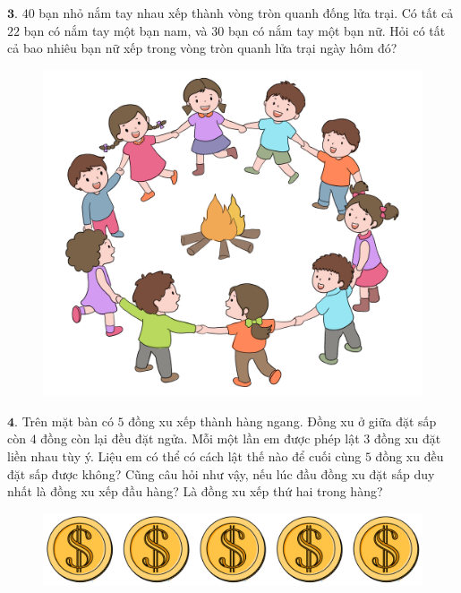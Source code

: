 \begin{multicols}{2}
\begin{figure}[H]
		\vspace*{-15pt}
	\end{figure}
	$\pmb{3.}$ $40$ bạn nhỏ nắm tay nhau xếp thành vòng tròn quanh đống lửa trại. Có tất cả $22$ bạn có nắm tay một bạn nam, và $30$ bạn có nắm tay một bạn nữ. Hỏi có tất cả bao nhiêu bạn nữ xếp trong vòng tròn quanh lửa trại ngày hôm đó?
	\begin{figure}[H]
		\centering
		\vspace*{-10pt}
		\captionsetup{labelformat= empty, justification=centering}
		\includegraphics[width=0.9\linewidth]{Pi12_Bai3}
		\vspace*{-10pt}
	\end{figure}
	$\pmb{4.}$ Trên mặt bàn có $5$ đồng xu xếp thành hàng ngang. Đồng xu ở giữa đặt sấp còn $4$ đồng còn lại đều đặt ngửa. Mỗi một lần em được phép lật $3$ đồng xu đặt liền nhau tùy ý. Liệu em có thể có cách lật thế nào để cuối cùng $5$ đồng xu đều đặt sấp được không?
	\vskip 0.1cm
	Cũng câu hỏi như vậy, nếu lúc đầu đồng xu đặt sấp duy nhất là đồng xu xếp đầu hàng? Là đồng xu xếp thứ hai trong hàng?
	\begin{figure}[H]
		\centering
		\vspace*{-5pt}
		\captionsetup{labelformat= empty, justification=centering}
		\includegraphics[width=1\linewidth]{Pi12_Bai4}
		\vspace*{-20pt}

\end{figure}
\end{multicols}
